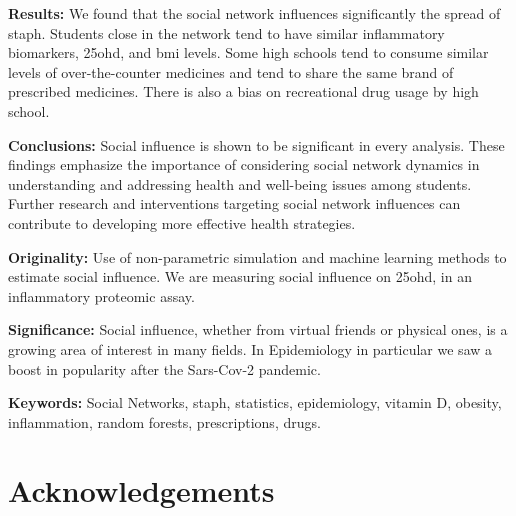 \documentclass[12pt,twoside,a4paper,fleqn, english]{report}
\begin{document}
\vspace{0.70\baselineskip}

\textbf{Results:} We found that the social network influences significantly the spread of \gls{staph}. Students close in the network tend to have similar inflammatory biomarkers, \gls{25ohd}, and \gls{bmi} levels. Some high schools tend to consume similar levels of over-the-counter medicines and tend to share the same brand of prescribed medicines. There is also a bias on recreational drug usage by high school.

\vspace{0.70\baselineskip}

\textbf{Conclusions:} Social influence is shown to be significant in every analysis. These findings emphasize the importance of considering social network dynamics in understanding and addressing health and well-being issues among students. Further research and interventions targeting social network influences can contribute to developing more effective health strategies.


\vspace{0.70\baselineskip}

\textbf{Originality:} Use of non-parametric simulation and machine learning methods to estimate social influence. We are measuring social influence on \gls{25ohd}, in an inflammatory proteomic assay.

\vspace{0.70\baselineskip}

\textbf{Significance:} Social influence, whether from virtual friends or physical ones, is a growing area of interest in many fields. In Epidemiology in particular we saw a boost in popularity after the Sars-Cov-2 pandemic.

\vspace{0.70\baselineskip}

\textbf{Keywords:} Social Networks, \gls{staph}, statistics, epidemiology, vitamin D, obesity, inflammation, random forests, prescriptions, drugs.


    
\chapter*{Acknowledgements}
\end{document}
